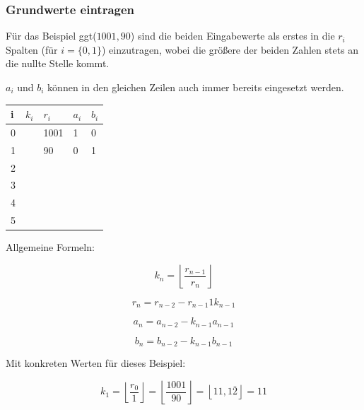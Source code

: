 \documentclass{scrartcl}
\begin{document}
\subsubsection{Grundwerte eintragen}

Für das Beispiel ggt($1001, 90$) sind die beiden Eingabewerte als erstes in die
$r_i$ Spalten (für $i = \{0, 1\}$) einzutragen, wobei die größere der beiden Zahlen
stets an die nullte Stelle kommt.

$a_i$ und $b_i$ können in den gleichen Zeilen auch immer bereits eingesetzt werden.

\begin{table}[h!]
	\begin{tabular}{|l|l|l|l|l|}
		\hline
		i & $k_i$ & $r_i$ & $a_i$ & $b_i$ \\ \hline
		0 &       & 1001  &   1   &   0   \\ \hline
		1 &       &   90  &   0   &   1   \\ \hline
		2 &       &       &       &       \\ \hline
		3 &       &       &       &       \\ \hline
		4 &       &       &       &       \\ \hline
		5 &       &       &       &       \\ \hline
	\end{tabular}
\end{table}

Allgemeine Formeln:

\begin{equation}
	k_n = \left\lfloor\frac{r_{n - 1}}{r_n}\right\rfloor
\end{equation}

\begin{equation}
	r_n = r_{n - 2} - r_{n - 1}1k_{n - 1}
\end{equation}

\begin{equation}
	a_n = a_{n - 2} - k_{n - 1}a_{n - 1}
\end{equation}

\begin{equation}
	b_n = b_{n - 2} - k_{n - 1}b_{n - 1}
\end{equation}

Mit konkreten Werten für dieses Beispiel:

\begin{equation}
	k_1 = \left\lfloor\frac{r_{0}}{1}\right\rfloor =
	\left\lfloor\frac{1001}{90}\right\rfloor =
	\left\lfloor 11,1\overline{2} \right\rfloor =
	11
\end{equation}
\end{document}
